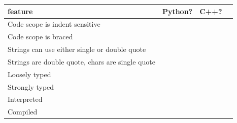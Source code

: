 \documentclass[letterpaper, 12pt]{article}
\newcommand{\ans}[1]{\color{Green4}\textbf{#1}\normalcolor}
\begin{document}
\begin{tabular}{| l | c | c | c |}
    \hline
    \textbf{feature} & \textbf{Python?} & \textbf{C++?} \\
    \hline
    Code scope is indent sensitive & \ans{\checkmark} & \\
    \hline
    Code scope is braced & & \ans{\checkmark} \\
    \hline
    Strings can use either single or double quote & \ans{\checkmark} & \\
    \hline
    Strings are double quote, chars are single quote & & \ans{\checkmark} \\
    \hline
    Loosely typed & \ans{\checkmark} & \\
    \hline
    Strongly typed & & \ans{\checkmark} \\
    \hline
    Interpreted & \ans{\checkmark} & \\
    \hline
    Compiled & & \ans{\checkmark} \\
    \hline
\end{tabular}
\end{document}
